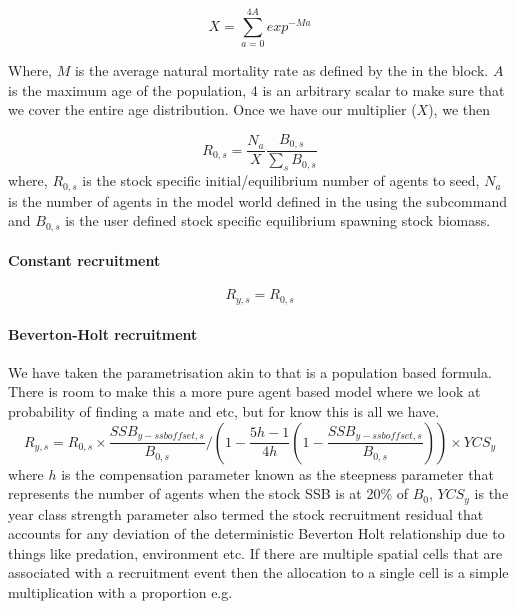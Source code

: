 \begin{equation}
	X = \sum_{a = 0}^{4A}exp^{-M a}
\end{equation}

Where, $M$ is the average natural mortality rate as defined by the  in the  block. $A$ is the maximum age of the population, $4$ is an arbitrary scalar to make sure that we cover the entire age distribution. Once we have our multiplier ($X$), we then


\begin{equation}
R_{0,s} = \frac{N_a}{X} \frac{B_{0,s}}{\sum_s B_{0,s}}
\end{equation}
where, $R_{0,s}$ is the stock specific initial/equilibrium number of agents to seed, $N_a$ is the number of agents in the model world defined in the  using the subcommand  and $B_{0,s}$ is the user defined stock specific equilibrium spawning stock biomass.

\paragraph{Constant recruitment}\label{subsubsec:constant-recruitment}

\begin{equation}
	R_{y,s} = R_{0,s}
\end{equation}

\paragraph{Beverton-Holt recruitment}\label{subsubsec:bev-holt-recruitment}

We have taken the parametrisation akin to \cite{mace_doonan_88} that is a population based formula. There is room to make this a more pure agent based model where we look at probability of finding a mate and etc, but for know this is all we have.
\begin{equation}
R_{y,s} = R_{0,s} \times \frac{SSB_{y-ssb offset,s}}{B_{0,s}}/ \left(1 - \frac{5h - 1}{4h} \left( 1 - \frac{SSB_{y-ssb offset,s}}{B_{0,s}}\right)\right) \times YCS_y
\end{equation}
where $h$ is the compensation parameter known as the steepness parameter that represents the number of agents when the stock SSB is at 20\% of $B_0$, $YCS_y$ is the year class strength parameter also termed the stock recruitment residual that accounts for any deviation of the deterministic Beverton Holt relationship due to things like predation, environment etc. If there are multiple spatial cells that are associated with a recruitment event then the allocation to a single cell is a simple multiplication with a proportion e.g.

